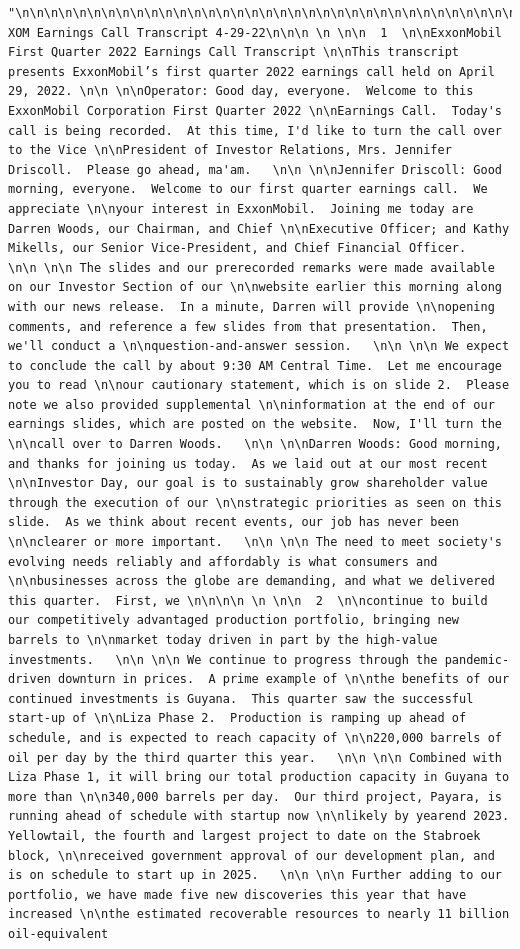 \documentclass[
  letterpaper,
  DIV=11,
  numbers=noendperiod]{scrreprt}
\begin{document}
\begin{verbatim}
"\n\n\n\n\n\n\n\n\n\n\n\n\n\n\n\n\n\n\n\n\n\n\n\n\n\n\n\n\n\n\n\n\n\n\n\n\n\n\n\n\n\n\n1Q22 XOM Earnings Call Transcript 4-29-22\n\n\n \n \n\n  1  \n\nExxonMobil First Quarter 2022 Earnings Call Transcript \n\nThis transcript presents ExxonMobil’s first quarter 2022 earnings call held on April 29, 2022. \n\n \n\nOperator: Good day, everyone.  Welcome to this ExxonMobil Corporation First Quarter 2022 \n\nEarnings Call.  Today's call is being recorded.  At this time, I'd like to turn the call over to the Vice \n\nPresident of Investor Relations, Mrs. Jennifer Driscoll.  Please go ahead, ma'am.   \n\n \n\nJennifer Driscoll: Good morning, everyone.  Welcome to our first quarter earnings call.  We appreciate \n\nyour interest in ExxonMobil.  Joining me today are Darren Woods, our Chairman, and Chief \n\nExecutive Officer; and Kathy Mikells, our Senior Vice-President, and Chief Financial Officer.   \n\n \n\n The slides and our prerecorded remarks were made available on our Investor Section of our \n\nwebsite earlier this morning along with our news release.  In a minute, Darren will provide \n\nopening comments, and reference a few slides from that presentation.  Then, we'll conduct a \n\nquestion-and-answer session.   \n\n \n\n We expect to conclude the call by about 9:30 AM Central Time.  Let me encourage you to read \n\nour cautionary statement, which is on slide 2.  Please note we also provided supplemental \n\ninformation at the end of our earnings slides, which are posted on the website.  Now, I'll turn the \n\ncall over to Darren Woods.   \n\n \n\nDarren Woods: Good morning, and thanks for joining us today.  As we laid out at our most recent \n\nInvestor Day, our goal is to sustainably grow shareholder value through the execution of our \n\nstrategic priorities as seen on this slide.  As we think about recent events, our job has never been \n\nclearer or more important.   \n\n \n\n The need to meet society's evolving needs reliably and affordably is what consumers and \n\nbusinesses across the globe are demanding, and what we delivered this quarter.  First, we \n\n\n\n \n \n\n  2  \n\ncontinue to build our competitively advantaged production portfolio, bringing new barrels to \n\nmarket today driven in part by the high-value investments.   \n\n \n\n We continue to progress through the pandemic-driven downturn in prices.  A prime example of \n\nthe benefits of our continued investments is Guyana.  This quarter saw the successful start-up of \n\nLiza Phase 2.  Production is ramping up ahead of schedule, and is expected to reach capacity of \n\n220,000 barrels of oil per day by the third quarter this year.   \n\n \n\n Combined with Liza Phase 1, it will bring our total production capacity in Guyana to more than \n\n340,000 barrels per day.  Our third project, Payara, is running ahead of schedule with startup now \n\nlikely by yearend 2023.  Yellowtail, the fourth and largest project to date on the Stabroek block, \n\nreceived government approval of our development plan, and is on schedule to start up in 2025.   \n\n \n\n Further adding to our portfolio, we have made five new discoveries this year that have increased \n\nthe estimated recoverable resources to nearly 11 billion oil-equivalent 
\end{verbatim}
\end{document}
